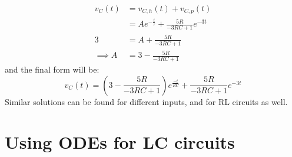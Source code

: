 \documentclass[nobib]{tufte-handout}
\begin{document}
\begin{align*}
    v_C(t)     & = v_{C,h}(t) + v_{C,p}(t)                       \\
               & = Ae^{-\frac{t}{\tau}}+\frac{5R}{-3RC+1}e^{-3t} \\
    3          & =A+\frac{5R}{-3RC+1}                            \\
    \implies A & =3-\frac{5R}{-3RC+1}
\end{align*}
and the final form will be:
\begin{equation*}
    v_C(t) = \left(3-\frac{5R}{-3RC+1}\right)e^{\frac{-t}{RC}}+\frac{5R}{-3RC+1}e^{-3t}
\end{equation*}
Similar solutions can be found for different inputs, and for RL circuits as well.

\section{Using ODEs for LC circuits}
\end{document}
